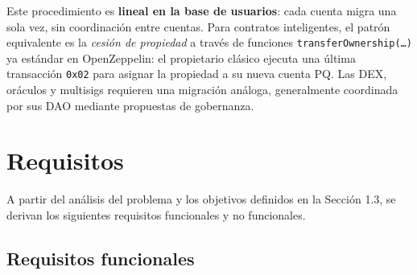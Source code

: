 Este procedimiento es \textbf{lineal en la base de usuarios}: cada cuenta migra una sola vez, sin coordinación entre cuentas. Para contratos inteligentes, el patrón equivalente es la \emph{cesión de propiedad} a través de funciones \texttt{transferOwnership(\ldots)} ya estándar en OpenZeppelin: el propietario clásico ejecuta una última transacción \texttt{0x02} para asignar la propiedad a su nueva cuenta PQ. Las DEX, oráculos y multisigs requieren una migración análoga, generalmente coordinada por sus DAO mediante propuestas de gobernanza.


\section{Requisitos}
\label{sec:requisitos}

A partir del análisis del problema y los objetivos definidos en la Sección 1.3, se derivan los siguientes requisitos funcionales y no funcionales.

\subsection{Requisitos funcionales}

